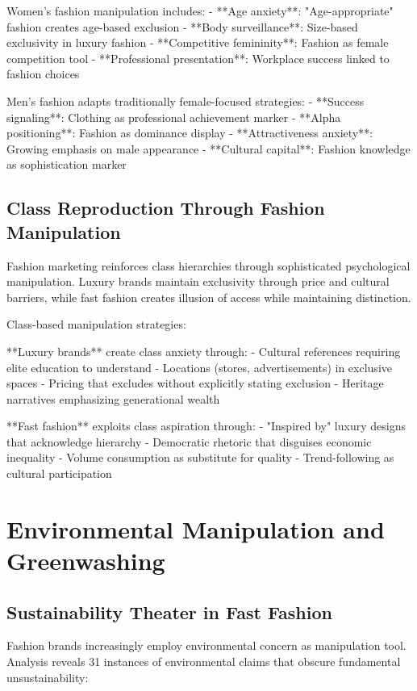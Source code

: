 Women's fashion manipulation includes:
- **Age anxiety**: "Age-appropriate" fashion creates age-based exclusion
- **Body surveillance**: Size-based exclusivity in luxury fashion
- **Competitive femininity**: Fashion as female competition tool
- **Professional presentation**: Workplace success linked to fashion choices

Men's fashion adapts traditionally female-focused strategies:
- **Success signaling**: Clothing as professional achievement marker
- **Alpha positioning**: Fashion as dominance display
- **Attractiveness anxiety**: Growing emphasis on male appearance
- **Cultural capital**: Fashion knowledge as sophistication marker

\subsection{Class Reproduction Through Fashion Manipulation}

Fashion marketing reinforces class hierarchies through sophisticated psychological manipulation. Luxury brands maintain exclusivity through price and cultural barriers, while fast fashion creates illusion of access while maintaining distinction.

Class-based manipulation strategies:

**Luxury brands** create class anxiety through:
- Cultural references requiring elite education to understand
- Locations (stores, advertisements) in exclusive spaces
- Pricing that excludes without explicitly stating exclusion
- Heritage narratives emphasizing generational wealth

**Fast fashion** exploits class aspiration through:
- "Inspired by" luxury designs that acknowledge hierarchy
- Democratic rhetoric that disguises economic inequality
- Volume consumption as substitute for quality
- Trend-following as cultural participation

\section{Environmental Manipulation and Greenwashing}
\label{sec:fashion_environment}

\subsection{Sustainability Theater in Fast Fashion}

Fashion brands increasingly employ environmental concern as manipulation tool. Analysis reveals 31 instances of environmental claims that obscure fundamental unsustainability:

